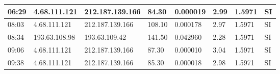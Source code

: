 \begin{table}[H]
\begin{tabular}{|l|l|l|l|l|l|l|l|}
		06:29 & 4.68.111.121 & 212.187.139.166 & 84.30 & 0.000019 & 2.99 & 1.5971 & SI \\ \hline
		08:03 & 4.68.111.121 & 212.187.139.166 & 108.10 & 0.000178 & 2.97 & 1.5971 & SI \\ \hline
		08:34 & 193.63.108.98 & 193.63.109.42 & 141.50 & 0.042960 & 2.28 & 1.5971 & SI \\ \hline
		09:06 & 4.68.111.121 & 212.187.139.166 & 87.30 & 0.000010 & 3.04 & 1.5971 & SI \\ \hline
		09:38 & 4.68.111.121 & 212.187.139.166 & 85.30 & 0.000018 & 2.98 & 1.5971 & SI \\ \hline
	\end{tabular}
\end{table}